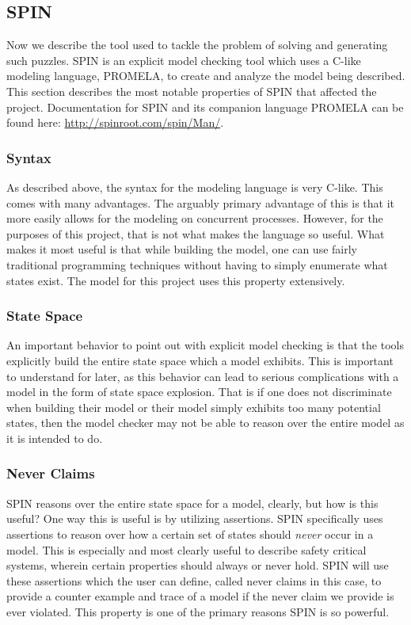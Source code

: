 \documentclass[a4paper]{article}
\begin{document}
\subsection{SPIN}

Now we describe the tool used to tackle the problem of solving and generating such puzzles. SPIN is an explicit model checking tool which uses a C-like modeling language, PROMELA, to create and analyze the model being described. This section describes the most notable properties of SPIN that affected the project. Documentation for SPIN and its companion language PROMELA can be found here: \url{http://spinroot.com/spin/Man/}.

\subsubsection{Syntax}
As described above,  the syntax for the modeling language is very C-like. This comes with many advantages. The arguably primary advantage of this is that it more easily allows for the modeling on concurrent processes. However, for the purposes of this project, that is not what makes the language so useful. What makes it most useful is that while building the model, one can  use fairly traditional programming techniques without having to simply enumerate what states exist. The model for this project uses this property extensively.

\subsubsection{State Space}
An important behavior to point out with explicit model checking is that the tools explicitly build the entire state space which a model exhibits. This is important to understand for later, as this behavior can lead to serious complications with a model in the form of state space explosion. That is if one does not discriminate when building their model or their model simply exhibits too many potential states, then the model checker may not be able to reason over the entire model as it is intended to do.

\subsubsection{Never Claims}
SPIN reasons over the entire state space for a model, clearly, but how is this useful? One way this is useful is by utilizing assertions. SPIN specifically uses assertions to reason over how a certain set of states should {\it never} occur in a model. This is especially and most clearly useful to describe safety critical systems, wherein certain properties should always or never hold. SPIN will use these assertions which the user can define, called never claims in this case, to provide a counter example and trace of a model if the never claim we provide is ever violated. This property is one of the primary reasons SPIN is so powerful.
\end{document}
